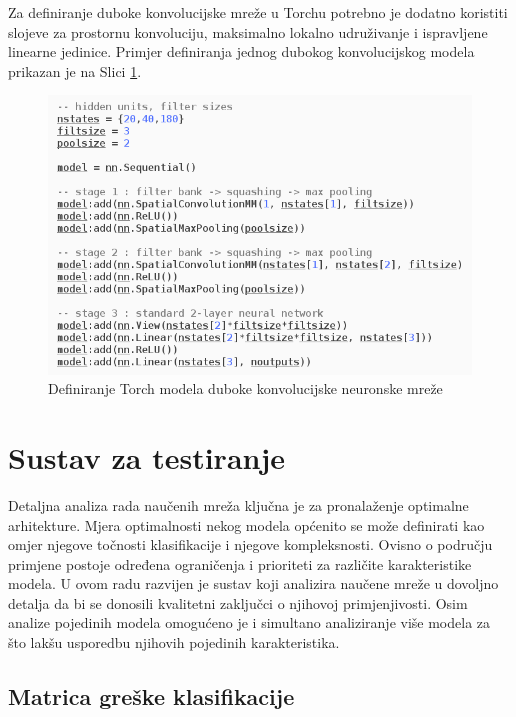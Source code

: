 \documentclass[lmodern, utf8, diplomski, numeric]{fer}
\begin{document}
Za definiranje duboke konvolucijske mreže u Torchu potrebno je dodatno koristiti slojeve za prostornu konvoluciju, maksimalno lokalno udruživanje i ispravljene linearne jedinice. Primjer definiranja jednog dubokog konvolucijskog modela prikazan je na Slici \ref{fig:cnntorch}.

\begin{figure}[ht!]
\centering
\includegraphics[width=16cm]{slike/cnn_model.png}
\caption{Definiranje Torch modela duboke konvolucijske neuronske mreže}
\label{fig:cnntorch}
\end{figure}

\newpage

\section{Sustav za testiranje}

Detaljna analiza rada naučenih mreža ključna je za pronalaženje optimalne arhitekture. Mjera optimalnosti nekog modela općenito se može definirati kao omjer njegove točnosti klasifikacije i njegove kompleksnosti. Ovisno o području primjene postoje određena ograničenja i prioriteti za različite karakteristike modela. U ovom radu razvijen je sustav koji analizira naučene mreže u dovoljno detalja da bi se donosili kvalitetni zaključci o njihovoj primjenjivosti. Osim analize pojedinih modela omogućeno je i simultano analiziranje više modela za što lakšu usporedbu njihovih pojedinih karakteristika.  

\subsection{Matrica greške klasifikacije}
\end{document}
